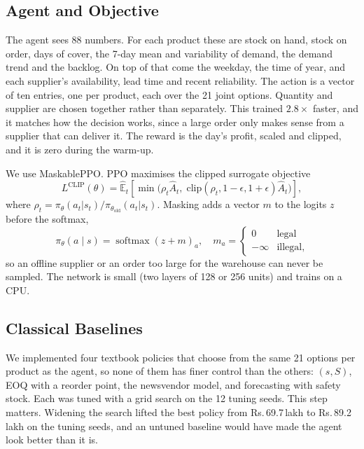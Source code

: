 \documentclass[10pt,twocolumn]{article}
\newcommand{\Rs}{\mbox{Rs.}\,}
\newcommand{\lakh}{\,lakh}
\begin{document}
\subsection{Agent and Objective}

The agent sees 88 numbers. For each product these are stock on hand, stock on
order, days of cover, the 7-day mean and variability of demand, the demand
trend and the backlog. On top of that come the weekday, the time of year, and
each supplier's availability, lead time and recent reliability. The action is a
vector of ten entries, one per product, each over the 21 joint options.
Quantity and supplier are chosen together rather than separately. This trained
$2.8\times$ faster, and it matches how the decision works, since a large order
only makes sense from a supplier that can deliver it. The reward is the day's
profit, scaled and clipped, and it is zero during the warm-up.

We use MaskablePPO. PPO maximises the clipped surrogate objective
\begin{equation}
L^{\text{CLIP}}(\theta)=\hat{\mathbb{E}}_t\!\left[\min\!\big(\rho_t\hat A_t,\;
\text{clip}(\rho_t,1-\epsilon,1+\epsilon)\hat A_t\big)\right],
\end{equation}
where $\rho_t=\pi_\theta(a_t|s_t)/\pi_{\theta_\text{old}}(a_t|s_t)$. Masking
adds a vector $m$ to the logits $z$ before the softmax,
\begin{equation}
\pi_\theta(a\mid s)=\operatorname{softmax}(z+m)_a,\quad
m_a=\begin{cases}0&\text{legal}\\-\infty&\text{illegal,}\end{cases}
\end{equation}
so an offline supplier or an order too large for the warehouse can never be
sampled. The network is small (two layers of 128 or 256 units) and trains on a
CPU.

\subsection{Classical Baselines}

We implemented four textbook policies that choose from the same 21 options per
product as the agent, so none of them has finer control than the others:
$(s,S)$, EOQ with a reorder point, the newsvendor model, and forecasting with
safety stock. Each was tuned with a grid search on the 12 tuning seeds. This
step matters. Widening the search lifted the best policy from \Rs 69.7\lakh{}
to \Rs 89.2\lakh{} on the tuning seeds, and an untuned baseline would have made
the agent look better than it is.
\end{document}
